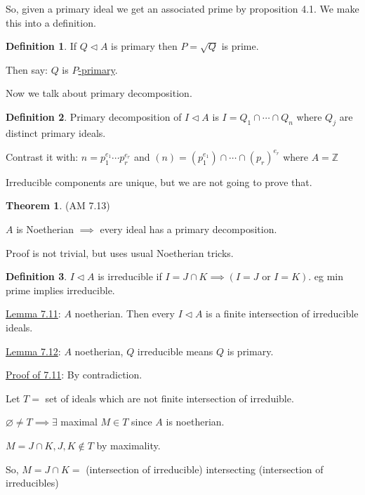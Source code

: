 \documentclass{article}
\theoremstyle{definition}
\newtheorem{definition}{Definition}
\newtheorem{theorem}{Theorem}
\begin{document}
So, given a primary ideal we get an associated prime by proposition 4.1. We make this into a definition.

\begin{definition}
    If \(Q \triangleleft A\) is primary then \(P = \sqrt{Q}\) is prime.
    
    Then say: \(Q\) is \underline{\(P\)-primary}.
\end{definition}

Now we talk about primary decomposition.

\begin{definition}
    Primary decomposition of \(I \triangleleft A\) is \(I = Q_1\cap\cdots\cap Q_n\) where \(Q_j\) are distinct primary ideals.  
\end{definition}

Contrast it with: \(n = p_1^{e_1}\cdots p_r^{e_r}\) and \((n)=(p_1^{e_1})\cap\cdots\cap (p_r)^{e_r}\) where \(A=\mathbb{Z}\) 

Irreducible components are unique, but we are not going to prove that.

\begin{theorem}
    (AM 7.13)

    \(A\) is Noetherian \(\implies\) every ideal has a primary decomposition. 
\end{theorem}

Proof is not trivial, but uses usual Noetherian tricks.

\begin{definition}
    \(I \triangleleft A\) is irreducible if \(I = J \cap K \implies (I = J \text{ or } I = K)\). eg min prime implies irreducible.  
\end{definition}

\underline{Lemma 7.11}: \(A\) noetherian. Then every \(I \triangleleft A\) is a finite intersection of irreducible ideals.

\underline{Lemma 7.12}: \(A\) noetherian, \(Q\) irreducible means \(Q\) is primary.

\underline{Proof of 7.11}: By contradiction.

Let \(T = \) set of ideals which are not finite intersection of irreduible.

\(\varnothing \neq T \implies \exists\) maximal \(M\in T\) since \(A\) is noetherian.

\(M=J\cap K, J,K\notin T\) by maximality.

So, \(M = J \cap K =\) (intersection of irreducible) intersecting (intersection of irreducibles)
\end{document}
